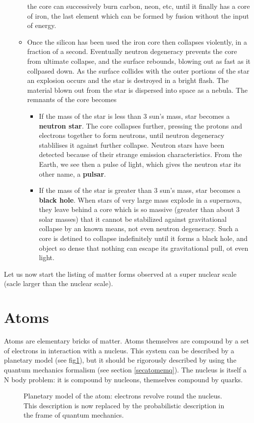 \documentclass[12pt]{book}
\begin{document}
\begin{itemize}
\begin{itemize}
the core can 
successively burn carbon, neon, etc, until it finally has a core of
iron, the last element which can be formed by fusion without the input
of energy. 
\item Once the silicon has
been used the iron core then collapses violently, in a fraction of a
second. Eventually neutron degeneracy prevents the core from ultimate
collapse, and the surface rebounds, blowing out as fast as it
collpased down. As the surface collides with the outer portions of the
star an 
explosion occurs and the star is destroyed in a bright flash. The
material blown out from the star is dispersed into space as a
nebula. The remnants of the core becomes 
\begin{itemize}
\item If the mass of the star is less than $3$ sun's mass, star
becomes a {\bf neutron star}. The core collapses
further, pressing the 
protons and electrons together to form neutrons, until neutron
degeneracy stablilises it against further collapse. Neutron stars have
been detected because of their strange emission characteristics. From
the Earth, we see then a pulse of light, which gives the neutron star
its other name, a {\bf pulsar}. 
\item  If the mass of the star is greater than $3$ sun's mass, star
becomes a {\bf black hole}. When stars of very large
mass explode in a 
supernova, they leave behind a core which is so massive (greater than
about 3 solar masses) that it cannot be stabilized against
gravitational collapse by an known means, not even neutron
degeneracy. Such a core is detined to collapse indefinitely until it
forms a black hole, and object so dense that nothing can escape its
gravitational pull, ot even light. 
\end{itemize}
\end{itemize}
\end{itemize}
Let us now start the listing of matter forms observed at a super
nuclear scale (sacle larger than the nuclear scale).

\section{Atoms}
Atoms are \cite{ph:atomi:Cagnac71,ph:mecaq:Cohen73} 
elementary bricks of matter. 
Atoms themselves are compound by a set of electrons in interaction with a
nucleus. This system can be described by a planetary model (see
fig\ref{figatome}), but it should be rigorously described by using the quantum
mechanics formalism (see section \ref{secatomemq}). The nucleus is itself a N
body problem: it is compound by nucleons, themselves compound by quarks.
\begin{figure}[htb]
 \centerline{}   
 \caption{Planetary model of the atom: electrons revolve round the
   nucleus. This description is now replaced by the probabilistic description
   in the frame of quantum mechanics.}
 \label{figatome}
\end{figure}
\end{document}
